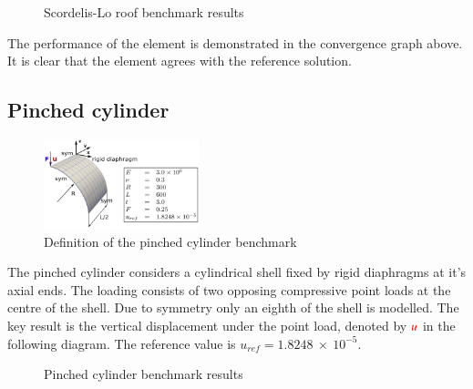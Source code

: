 \singlespacing
\begin{figure}[H]
	\caption{\label{ref_label_overall}Scordelis-Lo roof benchmark results}
\end{figure}

\doublespacing

The performance of the element is demonstrated in the convergence graph above. It is clear that the element agrees with the reference solution.

\subsection{Pinched cylinder}

\begin{figure}
	\centering
	\includegraphics[width=0.4\textwidth]{images/pinchedcylinder.png}
	\caption{Definition of the pinched cylinder benchmark\cite{Bou13}}
\end{figure}

The pinched cylinder considers a cylindrical shell fixed by rigid diaphragms at it's axial ends. The loading consists of two opposing compressive point loads at the centre of the shell. Due to symmetry only an eighth of the shell is modelled. The key result is the vertical displacement under the point load, denoted by $\textcolor{red}{u}$ in the following diagram. The reference value is $u_{ref} =  1.8248\ \times\ 10^{-5}$. 

\singlespacing
\begin{figure}[H]
	\caption{\label{ref_label_overall}Pinched cylinder benchmark results}
\end{figure}

